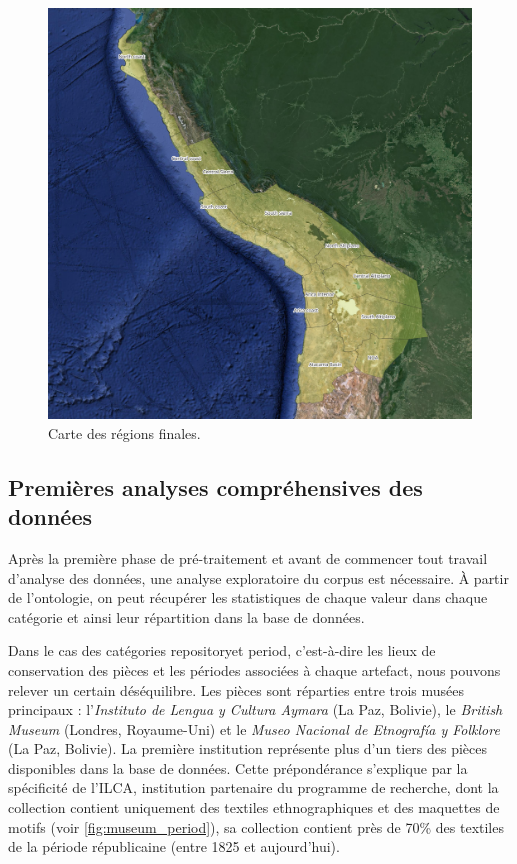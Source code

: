   \begin{figure}[!h]
	\begin{center}
		\includegraphics[width=15cm]{../images/region_fin.png}
           	 \caption{Carte des régions finales.}
           	 \label{fig:region}
	 \end{center}
  \end{figure}






\subsection{Premières analyses compréhensives des données}
Après la première phase de pré-traitement et avant de commencer tout travail d'analyse des données, une analyse exploratoire du corpus est nécessaire. À partir de l'ontologie, on peut récupérer les statistiques de chaque valeur dans chaque catégorie et ainsi leur répartition dans la base de données.

Dans le cas des catégories \og repository\fg \:et \og period\fg, c'est-à-dire les lieux de conservation des pièces et les périodes associées à chaque artefact, nous pouvons relever un certain déséquilibre. 
\noindent Les pièces sont réparties entre trois musées principaux : l'\textit{Instituto de Lengua y Cultura Aymara} (La Paz, Bolivie), le \textit{British Museum} (Londres, Royaume-Uni) et le \textit{Museo Nacional de Etnografía y Folklore} (La Paz, Bolivie). La première institution représente plus d'un tiers des pièces disponibles dans la base de données. Cette prépondérance s'explique par la spécificité de l'ILCA, institution partenaire du programme de recherche, dont la collection contient uniquement des textiles ethnographiques et des maquettes de motifs (voir \ref{fig:museum_period}), sa collection contient près de 70\% des textiles de la période républicaine (entre 1825 et aujourd'hui).

